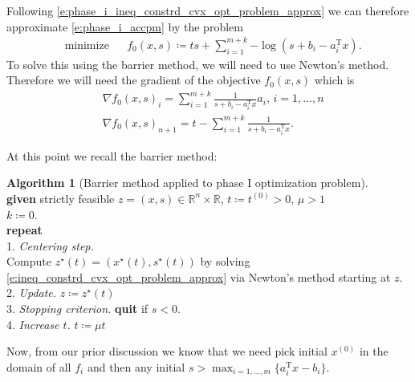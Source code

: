\documentclass[11pt]{amsart}
\theoremstyle{definition}
\newtheorem{algorithm}{Algorithm}[section]
\theoremstyle{remark}
\newcommand{\ind}{\hspace*{0.5cm}}
\newcommand{\transpose}{\text{T}}
\begin{document}
        Following \eqref{e:phase_i_ineq_constrd_cvx_opt_problem_approx} we can therefore approximate \eqref{e:phase_i_accpm} by the problem
        \begin{equation}\label{e:phase_i_accpm_approx}
            \begin{aligned}
            & {\text{minimize}} && 
            f_0(x, s)\coloneqq ts + \sum_{i=1}^{m+k}{-\log(s+b_i - a_i^\transpose x)}.
            \end{aligned}
        \end{equation}
        To solve this using the barrier method, we will need to use Newton's method. Therefore we will need the gradient of the objective $f_0(x, s)$ which is
        \begin{align*}
            &\nabla f_0(x, s)_i = \sum_{i=1}^{m+k} \frac{1}{s+b_i-a_i^\transpose x}a_i \text{, $i = 1, \dots, n$} \\ 
            &\nabla f_0(x, s)_{n+1} = t - \sum_{i=1}^{m+k} \frac{1}{s+b_i-a_i^\transpose x}. 
        \end{align*}

        At this point we recall the barrier method:
        \begin{algorithm}[Barrier method applied to phase I optimization problem]
        \label{a:basic_conceptual_cp_alg}\mbox{}\\
            \ind \textbf{given} strictly feasible $z = (x, s) \in \mathbb{R}^n \times \mathbb{R}$, $t \coloneqq t^{(0)} > 0$, $\mu > 1$ \\
            \ind $k \coloneqq 0$. \\
            \ind \textbf{repeat} \\
            \ind\ind 1. \emph{Centering step.} \\
            \ind\ind\ind Compute $z^\star(t) = (x^\star(t), s^\star(t))$ by solving \eqref{e:ineq_constrd_cvx_opt_problem_approx} via Newton's method starting at $z$. \\
            \ind\ind 2. \emph{Update.} $z \coloneqq z^\star(t)$ \\
            \ind\ind 3. \emph{Stopping criterion.} \textbf{quit} if $s < 0$. \\
            \ind\ind 4. \emph{Increase $t$.} $t \coloneqq \mu t$
        \end{algorithm}

        Now, from our prior discussion we know that we need pick initial $x^{(0)}$ in the domain of all $f_i$ and then any initial $s > \max_{i=1, \dots, m}\{a_i^\transpose x - b_i\}$.
\end{document}
